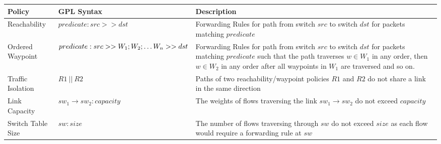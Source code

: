 \begin{table*}[thb!]
\begin{small}
	\begin{center}
		\begin{tabular}{||m{6em} | m{15em} | m{35em} ||} 
			\hline
			Policy &  GPL Syntax & Description \\ 
			\hline\hline
			Reachability & 	$predicate : src >> dst$ & Forwarding Rules for path from switch $src$ to switch $dst$ for packets matching $predicate$ \\
			\hline
			Ordered \newline Waypoint & $predicate :\newline src >> W_1;W_2; \ldots W_n >> dst$ & Forwarding Rules for path from switch $src$ to switch $dst$ for packets matching $predicate$ such that the path traverses $w \in W_1$ in any order, then $w \in W_2$ in any order after all waypoints in $W_1$ are traversed and so on.\\  
			\hline
			Traffic \newline Isolation & $R1 \ || \ R2$ & Paths of two reachability/waypoint policies $R1$ and $R2$ do not share a link in the same direction \\
			\hline
			Link \newline Capacity & $sw_1 \rightarrow sw_2 : capacity$  & The weights of flows traversing the link $sw_1 \rightarrow sw_2$ do not exceed $capacity$\\
			\hline
			Switch \newline Table Size & $sw : size$ & The number of flows traversing through $sw$ do not exceed $size$ as each flow would require a forwarding rule at $sw$ \\
			\hline\hline
		\end{tabular}
	\end{center}
	 \label{tab:policysupport} 
\end{small}
\end{table*}


